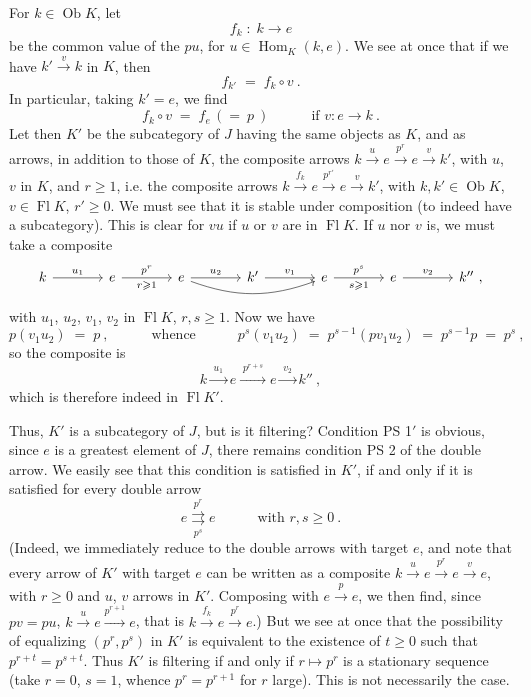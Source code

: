 \documentclass[11pt]{article}
\newcommand{\printedpage}[1]{\marginpar{\footnotesize p.~#1}}
\newcommand{\msp}[1]{\marginpar{\footnotesize [#1]}}
\newcommand{\Ob}{\operatorname{Ob}}
\newcommand{\Fl}{\operatorname{Fl}}
\newcommand{\Hom}{\operatorname{Hom}}
\begin{document}
For $k \in \Ob K$, let
\[ f_k \;:\; k \longrightarrow e \]
be the common value of the $pu$, for $u \in \Hom_K(k,e)$. We see at once that if we have $k' \xrightarrow{v} k$ in $K$, then
\[ f_{k'} \;=\; f_k \circ v \ . \]
\printedpage{138}
In particular, taking $k' = e$, we find
\[ f_k \circ v \;=\; f_e \,(=\ p\ ) \qquad\quad \text{if } v : e \longrightarrow k \ . \]
Let then $K'$ be the subcategory of $J$ having the same objects as $K$, and as arrows, in addition to those of $K$, the composite arrows $k \xrightarrow{u} e \xrightarrow{p^r} e \xrightarrow{v} k'$, with $u$, $v$ in $K$, and $r \geqslant 1$, i.e. the composite arrows $k \xrightarrow{f_k} e \xrightarrow{p^{r'}} e \xrightarrow{v} k'$, with $k, k' \in \Ob K$, $v \in \Fl K$, $r' \geqslant 0$. We must see that it is stable under composition (to indeed have a subcategory). This is clear for $vu$ if $u$ or $v$ are in $\Fl K$. If $u$ nor $v$ is, we must take a composite
\[
\begin{tikzcd}[column sep=large]
k \arrow[r, "u_1"] & e \arrow[r, "p^r", "r\geqslant 1"'] & e \arrow[r, "u_2"] \arrow[rr, bend right=20] & k' \arrow[r, "v_1"] & e \arrow[r, "p^s", "s\geqslant 1"'] & e \arrow[r, "v_2"] & k'' \ ,
\end{tikzcd}
\]
with $u_1$, $u_2$, $v_1$, $v_2$ in $\Fl K$, $r, s \geqslant 1$. Now we have
\[ p(v_1u_2) \;=\; p \ , \qquad\quad \text{whence} \qquad\quad p^s(v_1u_2) \;=\; p^{s-1}(pv_1u_2) \;=\; p^{s-1}p \;=\; p^s \ , \]
so the composite is
\[ k \xrightarrow{\;u_1\;} e \xrightarrow{\;p^{r+s}\;} e \xrightarrow{\;v_2\;} k'' \ , \]
which
\msp{page 365}
is therefore indeed in $\Fl K'$.

Thus, $K'$ is a subcategory of $J$, but is it filtering? Condition PS 1$'$ is obvious, since $e$ is a greatest element of $J$, there remains condition PS 2 of the double arrow. We easily see that this condition is satisfied in $K'$, if and only if it is satisfied for every double arrow
\[ e \overset{p^r}{\underset{p^s}{\rightrightarrows}} e \qquad\quad \text{with } r, s \geqslant 0 \ . \]
(Indeed, we immediately reduce to the double arrows with target $e$, and note that every arrow of $K'$ with target $e$ can be written as a composite $k \xrightarrow{u} e \xrightarrow{p^r} e \xrightarrow{v} e$, with $r \geqslant 0$ and $u$, $v$ arrows in $K'$. Composing with $e \xrightarrow{p} e$, we then find, since $pv = pu$, $k \xrightarrow{u} e \xrightarrow{p^{r+1}} e$, that is $k \xrightarrow{f_k} e \xrightarrow{p^r} e$.) But we see at once that the possibility of equalizing $(p^r, p^s)$ in $K'$ is equivalent to the existence of $t \geqslant 0$ such that $p^{r+t} = p^{s+t}$. Thus $K'$ is filtering if and only if $r \longmapsto p^r$ is a stationary sequence (take $r = 0$, $s = 1$, whence $p^r = p^{r+1}$ for $r$ large). This is
\msp{page 366}
not necessarily the case.
\end{document}
